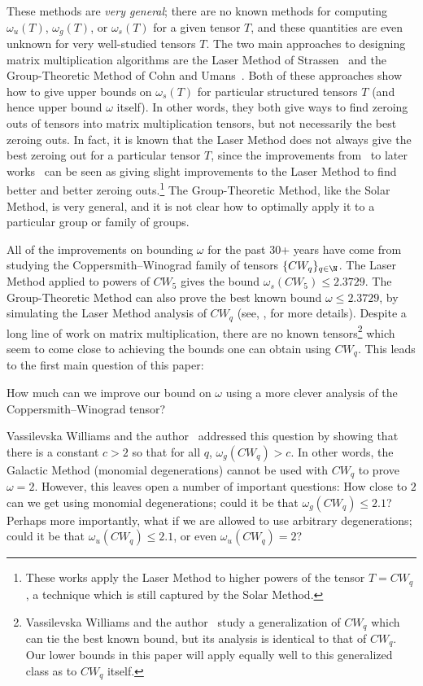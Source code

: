 \documentclass{toc}
\begin{document}
These methods are \emph{very general}; there are no known methods for computing $\omega_u(T)$, $\omega_g(T)$, or $\omega_s(T)$ for a given tensor $T$, and these quantities are even unknown for very well-studied tensors $T$. The two main approaches to designing matrix multiplication algorithms are the Laser Method of Strassen~\cite{strassenlaser1} and the Group-Theoretic Method of Cohn and Umans~\cite{cohn2003group}. Both of these approaches show how to give upper bounds on $\omega_s(T)$ for particular structured tensors $T$ (and hence upper bound $\omega$ itself). In other words, they both give ways to find zeroing outs of tensors into matrix multiplication tensors, but not necessarily the best zeroing outs. In fact, it is known that the Laser Method does not always give the best zeroing out for a particular tensor $T$, since the improvements from~\cite{coppersmith} to 
%
later works~\cite{stothers,v12,legall,awrefined} 
can be seen as giving slight improvements to the Laser Method to find better and better zeroing outs.\footnote{These works apply the Laser Method to higher powers of the tensor $T = CW_q$, a technique which is still captured by the Solar Method.} The Group-Theoretic Method, like the Solar Method, is very general, and it is not clear how to optimally apply it to a particular group or family of groups.

All of the improvements on bounding $\omega$ for the past 30+ years have come from studying the Coppersmith--Winograd family of tensors $\{CW_q\}_{q \in \N}$. The Laser Method applied to powers of $CW_5$ gives the bound $\omega_s(CW_5) \leq 2.3729$. The Group-Theoretic Method can also prove the best known bound $\omega \leq 2.3729$, by simulating the Laser Method analysis of $CW_q$ (see, \eg, \cite{almanitcs} for more details). Despite a long line of work on matrix multiplication, there are no known tensors\footnote{
%
Vassilevska Williams and the author~\cite{aw} %
study a generalization of $CW_q$ which can tie the best known bound, but its analysis is identical to that of $CW_q$. Our lower bounds in this paper will apply equally well to this generalized class as to $CW_q$ itself.} which seem to come close to achieving the bounds one can obtain using $CW_q$. This leads to the first main question of this paper: 
\begin{question}\label{q1}
How much can we improve our bound on $\omega$ using a more clever analysis of the Coppersmith--Winograd tensor?
\end{question}

%
Vassilevska Williams and the author~\cite{aw} %
addressed this question by showing that there is a constant $c>2$ so that for all $q$, $\omega_g(CW_q) > c$. In other words, the Galactic Method (monomial degenerations) cannot be used with $CW_q$ to prove $\omega=2$. However, this leaves open a number of important questions: How close to $2$ can we get using monomial degenerations; could it be that $\omega_g(CW_q) \leq 2.1$? Perhaps more importantly, what if we are allowed to use arbitrary degenerations; could it be that $\omega_u(CW_q) \leq 2.1$, or even $\omega_u(CW_q) = 2$?
\end{document}
